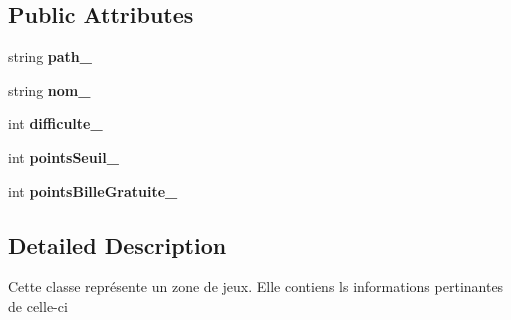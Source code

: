 \subsection*{Public Attributes}
\begin{DoxyCompactItemize}
\item 
\hypertarget{class_interface_graphique_1_1_zone_de_jeux_a1ee5cab2169cab195ece7bdf7ddbc725}{string {\bfseries path\-\_\-}}\label{class_interface_graphique_1_1_zone_de_jeux_a1ee5cab2169cab195ece7bdf7ddbc725}

\item 
\hypertarget{class_interface_graphique_1_1_zone_de_jeux_a373e662b1541fdb400ade24ccd8651bf}{string {\bfseries nom\-\_\-}}\label{class_interface_graphique_1_1_zone_de_jeux_a373e662b1541fdb400ade24ccd8651bf}

\item 
\hypertarget{class_interface_graphique_1_1_zone_de_jeux_ad39703673eb1f2d7af99e3ecb02e4544}{int {\bfseries difficulte\-\_\-}}\label{class_interface_graphique_1_1_zone_de_jeux_ad39703673eb1f2d7af99e3ecb02e4544}

\item 
\hypertarget{class_interface_graphique_1_1_zone_de_jeux_a4bdf50cae9be7a36862922813590feaa}{int {\bfseries points\-Seuil\-\_\-}}\label{class_interface_graphique_1_1_zone_de_jeux_a4bdf50cae9be7a36862922813590feaa}

\item 
\hypertarget{class_interface_graphique_1_1_zone_de_jeux_a03ea51f5294fb770a91e2da85bbeb554}{int {\bfseries points\-Bille\-Gratuite\-\_\-}}\label{class_interface_graphique_1_1_zone_de_jeux_a03ea51f5294fb770a91e2da85bbeb554}

\end{DoxyCompactItemize}


\subsection{Detailed Description}
Cette classe représente un zone de jeux. Elle contiens ls informations pertinantes de celle-\/ci 



